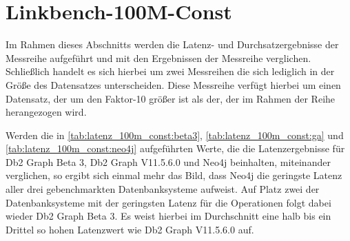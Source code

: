 \begin{table}[!h]
\centering
{}
\caption{Latenz Linkbench-10M-Const-ID Neo4j}
\label{tab:latenz_10m_const_id:neo4j}
\end{table}

\section{Linkbench-100M-Const}
\label{ergebnisse:100m_const}
Im Rahmen dieses Abschnitts werden die Latenz- und Durchsatzergebnisse der Messreihe  aufgeführt und mit den Ergebnissen der Messreihe  verglichen. Schließlich handelt es sich hierbei um zwei Messreihen die sich lediglich in der Größe des Datensatzes unterscheiden. Diese Messreihe verfügt hierbei um einen Datensatz, der um den Faktor-10 größer ist als der, der im Rahmen der Reihe  herangezogen wird. 

Werden die in \autoref{tab:latenz_100m_const:beta3}, \autoref{tab:latenz_100m_const:ga} und \autoref{tab:latenz_100m_const:neo4j} aufgeführten Werte, die die Latenzergebnisse für Db2 Graph Beta 3, Db2 Graph V11.5.6.0 und Neo4j beinhalten, miteinander verglichen, so ergibt sich einmal mehr das Bild, dass Neo4j die geringste Latenz aller drei gebenchmarkten Datenbanksysteme aufweist. Auf Platz zwei der Datenbanksysteme mit der geringsten Latenz für die Operationen folgt dabei wieder Db2 Graph Beta 3. Es weist hierbei im Durchschnitt eine halb bis ein Drittel so hohen Latenzwert wie Db2 Graph V11.5.6.0 auf.

